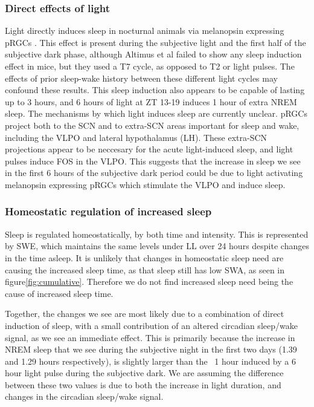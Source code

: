 \subsubsection{Direct effects of light}
Light directly induces sleep in nocturnal animals 
via melanopsin expressing pRGCs
\cite{lupi_acute_2008, altimus_rods-cones_2008, tsai_melanopsin_2009,
muindi_acute_2013}.
This effect is present during the subjective light and the 
first half of the subjective dark phase\cite{muindi_acute_2013, 
lupi_acute_2008, tsai_melanopsin_2009}, although 
Altimus et al\cite{altimus_rods-cones_2008} failed to show 
any sleep induction effect in mice, but they used a T7 cycle, 
as opposed to T2 or light pulses.
The effects of prior sleep-wake history between
these different light cycles may confound these 
results\cite{muindi_retino-hypothalamic_2014}.
This sleep induction also appears to be capable of 
lasting up to 3 hours\cite{altimus_rods-cones_2008},
and 6 hours of light at ZT 13-19 induces 1 hour of extra
NREM sleep\cite{muindi_acute_2013}.
The mechanisms by which light induces sleep are currently 
unclear. 
pRGCs project both to the SCN and to extra-SCN areas important 
for sleep and wake, including the VLPO and 
lateral hypothalamus 
(LH)\cite{muindi_retino-hypothalamic_2014, mistlberger_circadian_2005}.
These extra-SCN projections appear to be neccesary for the 
acute light-induced sleep\cite{rupp_distinct_2019},
and light pulses induce FOS in the VLPO\cite{lupi_acute_2008, 
tsai_melanopsin_2009}.
This suggests that the increase in sleep we see in the 
first 6 hours of the subjective dark period could be 
due to light activating melanopsin 
expressing pRGCs which stimulate the VLPO and 
induce sleep. 

\subsubsection{Homeostatic regulation of increased sleep}
Sleep is regulated homeostatically, by both time and intensity.
This is represented by SWE, which maintains the same levels 
under LL over 
24 hours despite changes in the time asleep\cite{northeast_sleep_2019}.
It is unlikely that changes in homeostatic sleep need are causing
the increased sleep time, as that sleep 
still has low SWA, as seen in figure\ref{fig:cumulative}.
Therefore we do not find increased sleep need being the cause 
of increased sleep time. 
\newline

Together, the changes we see are most likely due to a combination 
of direct induction of sleep, with a small contribution of an 
altered circadian sleep/wake signal, as we see an immediate
effect.
This is primarily because the increase in NREM sleep that we see 
during the subjective night in the first two days (1.39 and 1.29 hours 
respectively), is slightly larger than the ~1 hour induced by a 6 hour 
light pulse during the subjective dark\cite{muindi_acute_2013}.
We are assuming the difference between these two values is due to 
both the increase in light duration, and changes in the circadian
sleep/wake signal.



